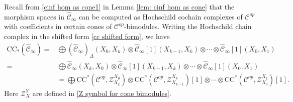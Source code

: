 \documentclass[11pt]{amsproc}
\def\cZ{\mathcal{Z}}
\def\cc{\mathcal{C}}
\def\r#1{\mathrm{#1}}
\def\D{\Delta}
\def\cinf{\widehat{\cc}_{\infty}}
\theoremstyle{remark}
\numberwithin{equation}{section}
\begin{document}
Recall from \eqref{cinf hom as cone1} in Lemma \ref{lem: cinf hom as cone} that the morphism spaces in $\cinf$ can be computed as Hochschild cochain complexes of $\cc^{op}$ with coefficients in certain cones of $\cc^{op}$-bimodules.
Writing the Hochschild chain complex in the shifted form \eqref{cc shifted form}, we have
\begin{align}
\r{CC}_{*}(\cinf) = &\bigoplus (\cinf)_{\D}(X_{0}, X_{k}) \otimes \cinf[1](X_{k-1}, X_{k}) \otimes \cdots \otimes \cinf[1](X_{0}, X_{1}) \\
= &\bigoplus \cinf(X_{k}, X_{0}) \otimes \cinf[1](X_{k-1}, X_{k}) \otimes \cdots \otimes \cinf[1](X_{0}, X_{1}) \label{computing cc of cinf 1}\\
&= \bigoplus \r{CC}^{*}(\cc^{op}, \cZ_{X_{k}}^{X_{0}}) \otimes \r{CC}^{*}(\cc^{op}, \cZ_{X_{k-1}}^{X_{k}})[1] \otimes \cdots \otimes \r{CC}^{*}(\cc^{op}, \cZ_{X_{0}}^{X_{1}})[1]. \label{computing cc of cinf 2}
\end{align}
Here $\cZ_{X}^{Y}$ are defined in \eqref{Z symbol for cone bimodules}.
\end{document}
